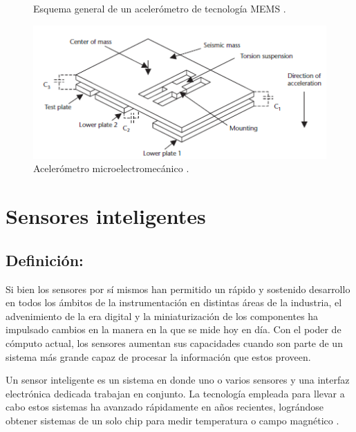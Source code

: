 \begin{itemize}
\begin{itemize}
\begin{figure}[H]
\begin{minipage}{0.45\textwidth}
                    \caption{Esquema general de un acelerómetro de tecnología MEMS \citep{dunn2005introduction}.}
                    \label{fig:acc-mems1}
                \end{minipage}
                \hfill
                \begin{minipage}{0.45\textwidth}
                    \centering
                    \includegraphics[width=1\textwidth]{imagenes/cap1_marcoteo/AccelerometerMEMS2.png}
                    \caption{Acelerómetro microelectromecánico \citep{dunn2005introduction}.}
                    \label{fig:acc-mems2}
                \end{minipage}
            \end{figure}
        \end{itemize}

    \end{itemize}

\section{Sensores inteligentes}

\subsection{Definición:}

Si bien los sensores por sí mismos han permitido un rápido y sostenido desarrollo en todos los ámbitos de la instrumentación en distintas áreas de la industria, el advenimiento de la era digital y la miniaturización de los componentes ha impulsado cambios en la manera en la que se mide hoy en día. Con el poder de cómputo actual, los sensores aumentan sus capacidades cuando son parte de un sistema más grande capaz de procesar la información que estos proveen.



Un sensor inteligente es un sistema en donde uno o varios sensores y una interfaz electrónica dedicada trabajan en conjunto. La tecnología empleada para llevar a cabo estos sistemas ha avanzado rápidamente en años recientes, lográndose obtener sistemas de un solo chip para medir temperatura o campo magnético \citep{nagayama2007structural}.


